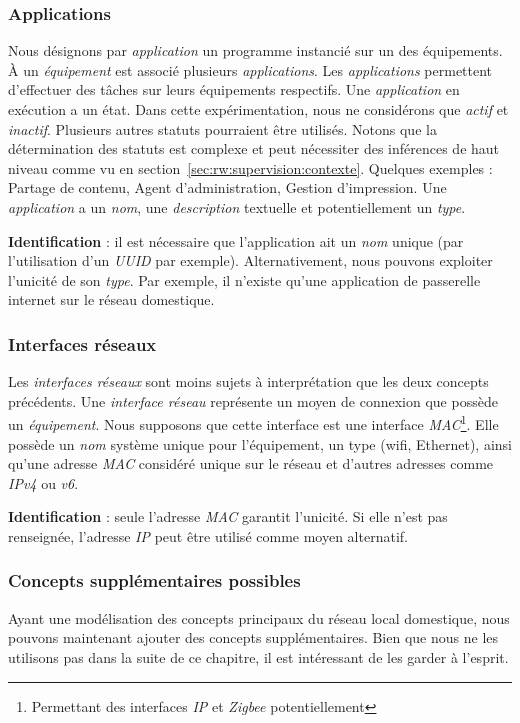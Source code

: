 \subsubsection{Applications}
Nous désignons par \textit{application} un programme instancié sur un des équipements. À un \textit{équipement} est associé plusieurs \textit{applications}. Les \textit{applications} permettent d'effectuer des tâches sur leurs équipements respectifs. Une \textit{application} en exécution a un état. Dans cette expérimentation, nous ne considérons que \textit{actif} et \textit{inactif}. Plusieurs autres statuts pourraient être utilisés. Notons que la détermination des statuts est complexe et peut nécessiter des inférences de haut niveau comme vu en section~\ref{sec:rw:supervision:contexte}. Quelques exemples : Partage de contenu, Agent d'administration, Gestion d'impression. Une \textit{application} a un \textit{nom}, une \textit{description} textuelle et potentiellement un \textit{type}.

\textbf{Identification} : il est nécessaire que l'application ait un \textit{nom} unique (par l'utilisation d'un \textit{UUID} par exemple). Alternativement, nous pouvons exploiter l'unicité de son \textit{type}. Par exemple, il n'existe qu'une application de passerelle internet sur le réseau domestique.

\subsubsection{Interfaces réseaux}
Les \textit{interfaces réseaux} sont moins sujets à interprétation que les deux concepts précédents. Une \textit{interface réseau} représente un moyen de connexion que possède un \textit{équipement}. Nous supposons que cette interface est une interface \textit{MAC}\footnote{Permettant des interfaces \textit{IP} et \textit{Zigbee} potentiellement}. Elle possède un \textit{nom} système unique pour l'équipement, un type (wifi, Ethernet), ainsi qu'une adresse \textit{MAC} considéré unique sur le réseau et d'autres adresses comme \textit{IPv4} ou \textit{v6}.

\textbf{Identification} : seule l'adresse \textit{MAC} garantit l'unicité. Si elle n'est pas renseignée, l'adresse \textit{IP} peut être utilisé comme moyen alternatif.

\subsubsection{Concepts supplémentaires possibles}
Ayant une modélisation des concepts principaux du réseau local domestique, nous pouvons maintenant ajouter des concepts supplémentaires. Bien que nous ne les utilisons pas dans la suite de ce chapitre, il est intéressant de les garder à l'esprit.

